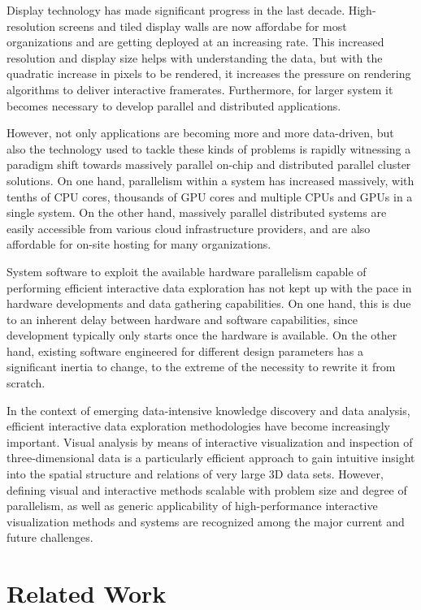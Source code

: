 Display technology has made significant progress in the last decade.
High-resolution screens and tiled display walls are now affordabe for most
organizations and are getting deployed at an increasing rate. This increased
resolution and display size helps with understanding the data, but with the
quadratic increase in pixels to be rendered, it increases the pressure on
rendering algorithms to deliver interactive framerates. Furthermore, for larger
system it becomes necessary to develop parallel and distributed applications.

However, not only applications are becoming more and more data-driven, but also
the technology used to tackle these kinds of problems is rapidly witnessing a
paradigm shift towards massively parallel on-chip and distributed parallel
cluster solutions. On one hand, parallelism within a system has increased
massively, with tenths of CPU cores, thousands of GPU cores and multiple CPUs
and GPUs in a single system. On the other hand, massively parallel distributed
systems are easily accessible from various cloud infrastructure providers, and
are also affordable for on-site hosting for many organizations.

System software to exploit the available hardware parallelism capable of
performing efficient interactive data exploration has not kept up with the pace
in hardware developments and data gathering capabilities. On one hand, this is
due to an inherent delay between hardware and software capabilities, since
development typically only starts once the hardware is available. On the other
hand, existing software engineered for different design parameters has a
significant inertia to change, to the extreme of the necessity to rewrite it
from scratch.

In the context of emerging data-intensive knowledge discovery and data analysis,
efficient interactive data exploration methodologies have become increasingly
important. Visual analysis by means of interactive visualization and inspection
of three-dimensional data is a particularly efficient approach to gain intuitive
insight into the spatial structure and relations of very large 3D data sets.
However, defining visual and interactive methods scalable with problem size and
degree of parallelism, as well as generic applicability of high-performance
interactive visualization methods and systems are recognized among the major
current and future challenges.


\section{Related Work} %

